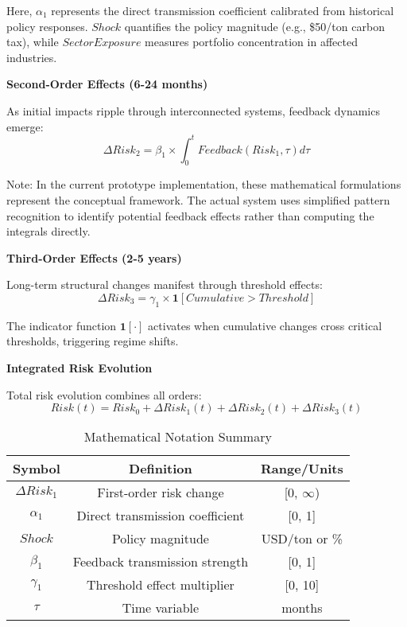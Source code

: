 \documentclass[conference]{IEEEtran}
\begin{document}
Here, $\alpha_1$ represents the direct transmission coefficient calibrated from historical policy responses. $Shock$ quantifies the policy magnitude (e.g., \$50/ton carbon tax), while $SectorExposure$ measures portfolio concentration in affected industries.

\textbf{Second-Order Effects (6-24 months)}

As initial impacts ripple through interconnected systems, feedback dynamics emerge:
\begin{equation}
\Delta Risk_2 = \beta_1 \times \int_0^t Feedback(Risk_1, \tau) d\tau
\end{equation}

Note: In the current prototype implementation, these mathematical formulations represent the conceptual framework. The actual system uses simplified pattern recognition to identify potential feedback effects rather than computing the integrals directly.

\textbf{Third-Order Effects (2-5 years)}

Long-term structural changes manifest through threshold effects:
\begin{equation}
\Delta Risk_3 = \gamma_1 \times \mathbf{1}[Cumulative > Threshold]
\end{equation}

The indicator function $\mathbf{1}[\cdot]$ activates when cumulative changes cross critical thresholds, triggering regime shifts.

\textbf{Integrated Risk Evolution}

Total risk evolution combines all orders:
\begin{equation}
Risk(t) = Risk_0 + \Delta Risk_1(t) + \Delta Risk_2(t) + \Delta Risk_3(t)
\end{equation}

\begin{table}[htbp]
\caption{Mathematical Notation Summary}
\begin{center}
\begin{tabular}{|c|c|c|}
\hline
\textbf{Symbol} & \textbf{Definition} & \textbf{Range/Units} \\
\hline
$\Delta Risk_1$ & First-order risk change & [0, $\infty$) \\
\hline
$\alpha_1$ & Direct transmission coefficient & [0, 1] \\
\hline
$Shock$ & Policy magnitude & USD/ton or \% \\
\hline
$\beta_1$ & Feedback transmission strength & [0, 1] \\
\hline
$\gamma_1$ & Threshold effect multiplier & [0, 10] \\
\hline
$\tau$ & Time variable & months \\
\hline
\end{tabular}
\label{tab:notation}
\end{center}
\end{table}
\end{document}
